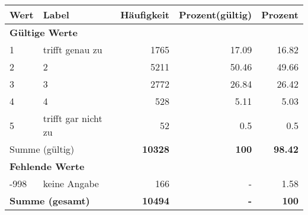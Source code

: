      \begin{longtable}{lXrrr}
     \toprule
     \textbf{Wert} & \textbf{Label} & \textbf{Häufigkeit} & \textbf{Prozent(gültig)} & \textbf{Prozent} \\
     \endhead
     \midrule
     \multicolumn{5}{l}{\textbf{Gültige Werte}}\\

     1 &
     \multicolumn{1}{X}{ trifft genau zu   } &


       \num{1765} &
       \num[round-mode=places,round-precision=2]{17,09} &
         \num[round-mode=places,round-precision=2]{16,82} \\

     2 &
     \multicolumn{1}{X}{ 2   } &


       \num{5211} &
       \num[round-mode=places,round-precision=2]{50,46} &
         \num[round-mode=places,round-precision=2]{49,66} \\

     3 &
     \multicolumn{1}{X}{ 3   } &


       \num{2772} &
       \num[round-mode=places,round-precision=2]{26,84} &
         \num[round-mode=places,round-precision=2]{26,42} \\

     4 &
     \multicolumn{1}{X}{ 4   } &


       \num{528} &
       \num[round-mode=places,round-precision=2]{5,11} &
         \num[round-mode=places,round-precision=2]{5,03} \\

     5 &
     \multicolumn{1}{X}{ trifft gar nicht zu   } &


       \num{52} &
       \num[round-mode=places,round-precision=2]{0,5} &
         \num[round-mode=places,round-precision=2]{0,5} \\
     \midrule
     \multicolumn{2}{l}{Summe (gültig)} &
       \textbf{\num{10328}} &
     \textbf{100} &
       \textbf{\num[round-mode=places,round-precision=2]{98,42}} \\
     \multicolumn{5}{l}{\textbf{Fehlende Werte}}\\
       -998 &
       keine Angabe &
         \num{166} &
        - &
         \num[round-mode=places,round-precision=2]{1,58} \\
     \midrule
     \multicolumn{2}{l}{\textbf{Summe (gesamt)}} &
          \textbf{\num{10494}} &
        \textbf{-} &
        \textbf{100} \\
     \bottomrule
     \end{longtable}
     
